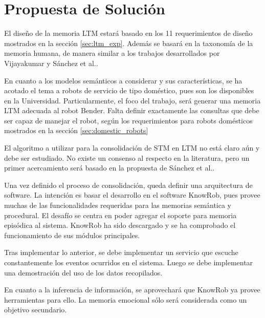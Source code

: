 \section{Propuesta de Solución}

%


El diseño de la memoria LTM estará basado en los 11 requerimientos de diseño mostrados en la sección \ref{sec:ltm_exp}. Además se basará en la taxonomía de la memoria humana, de manera similar a los trabajos desarrollados por Vijayakumar\cite{Vijayakumar2014} y Sánchez et al.\cite{Sanchez:2015}.

En cuanto a los modelos semánticos a considerar y sus características, se ha acotado el tema a robots de servicio de tipo doméstico, pues son los disponibles en la Universidad. Particularmente, el foco del trabajo, será generar una memoria LTM adecuada al robot Bender. Falta definir exactamente las consultas que debe ser capaz de manejar el robot, según los requerimientos para robots domésticos mostrados en la sección \ref{sec:domestic_robots}

El algoritmo a utilizar para la consolidación de STM en LTM no está claro aún y debe ser estudiado. No existe un consenso al respecto en la literatura, pero un primer acercamiento será basado en la propuesta de Sánchez et al.\cite{Sanchez:2015}.

Una vez definido el proceso de consolidación, queda definir una arquitectura de software. La intención es basar el desarrollo en el software KnowRob, pues provee muchas de las funcionalidades requeridas para las memorias semántica y procedural. El desafío se centra en poder agregar el soporte para memoria episódica al sistema. KnowRob ha sido descargado y se ha comprobado el funcionamiento de sus módulos principales.

Tras implementar lo anterior, se debe implementar un servicio que escuche constantemente los eventos ocurridos en el sistema. Luego se debe implementar una demostración del uso de los datos recopilados.

En cuanto a la inferencia de información, se aprovechará que KnowRob ya provee herramientas para ello. La memoria emocional sólo será considerada como un objetivo secundario.


